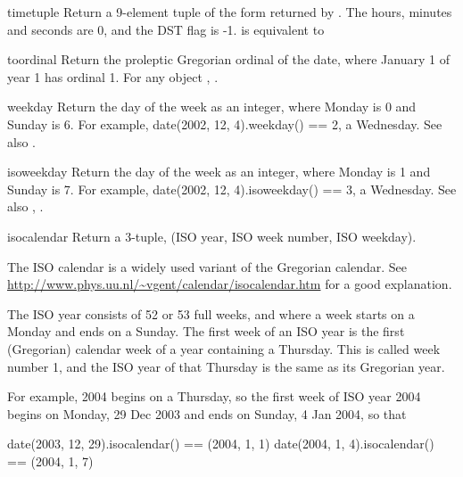 \begin{methoddesc}{timetuple}{}
    Return a 9-element tuple of the form returned by
    .  The hours, minutes and seconds are
    0, and the DST flag is -1.
     is equivalent to
\end{methoddesc}
\begin{methoddesc}{toordinal}{}
    Return the proleptic Gregorian ordinal of the date, where January 1
    of year 1 has ordinal 1.  For any  object ,
    .
\end{methoddesc}
\begin{methoddesc}{weekday}{}
    Return the day of the week as an integer, where Monday is 0 and
    Sunday is 6.  For example, date(2002, 12, 4).weekday() == 2, a
    Wednesday.
    See also .
\end{methoddesc}
\begin{methoddesc}{isoweekday}{}
    Return the day of the week as an integer, where Monday is 1 and
    Sunday is 7.  For example, date(2002, 12, 4).isoweekday() == 3, a
    Wednesday.
    See also , .
\end{methoddesc}
\begin{methoddesc}{isocalendar}{}
    Return a 3-tuple, (ISO year, ISO week number, ISO weekday).

    The ISO calendar is a widely used variant of the Gregorian calendar.
    See \url{http://www.phys.uu.nl/~vgent/calendar/isocalendar.htm}
    for a good explanation.

    The ISO year consists of 52 or 53 full weeks, and where a week starts
    on a Monday and ends on a Sunday.  The first week of an ISO year is
    the first (Gregorian) calendar week of a year containing a Thursday.
    This is called week number 1, and the ISO year of that Thursday is
    the same as its Gregorian year.

    For example, 2004 begins on a Thursday, so the first week of ISO
    year 2004 begins on Monday, 29 Dec 2003 and ends on Sunday, 4 Jan
    2004, so that

    date(2003, 12, 29).isocalendar() == (2004, 1, 1)
    date(2004, 1, 4).isocalendar() == (2004, 1, 7)
\end{methoddesc}
